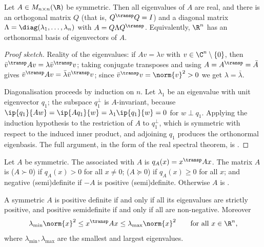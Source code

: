 \begin{theorem}\label{thm:spectral}
	Let $A\in M_{n\times n}(\R)$ be symmetric. Then all eigenvalues of $A$ are real,
	and there is an orthogonal matrix $Q$ (that is, $Q^{\transp}Q=I$) and a diagonal
	matrix $\Lambda=\diag(\lambda_1,\dots,\lambda_n)$ with
	$A=Q\Lambda Q^{\transp}$. Equivalently, $\R^n$ has an orthonormal basis of
	eigenvectors of $A$.
\end{theorem}

\begin{proof}[Proof sketch]
	Reality of the eigenvalues: if $Av=\lambda v$ with $v\in\C^n\setminus\{0\}$,
	then $\bar v^{\transp}Av=\lambda\bar v^{\transp}v$; taking conjugate transposes
	and using $A=A^{\transp}=\bar A$ gives
	$\bar v^{\transp}Av=\bar\lambda\bar v^{\transp}v$; since
	$\bar v^{\transp}v=\norm{v}^2>0$ we get $\lambda=\bar\lambda$.

	Diagonalisation proceeds by induction on $n$. Let $\lambda_1$ be an eigenvalue
	with unit eigenvector $q_1$; the subspace $q_1^{\perp}$ is $A$-invariant,
	because $\ip{q_1}{Aw}=\ip{Aq_1}{w}=\lambda_1\ip{q_1}{w}=0$ for
	$w\perp q_1$. Applying the induction hypothesis to the restriction of $A$ to
	$q_1^\perp$, which is symmetric with respect to the induced inner product, and
	adjoining $q_1$ produces the orthonormal eigenbasis. The full argument, in the
	form of the real spectral theorem, is \textcite[Ch.~7]{axler2024linear}.
\end{proof}

\begin{definition}\label{def:definiteness}
	Let $A$ be symmetric. The  associated with $A$ is
	$q_A(x)=x^{\transp}Ax$. The matrix $A$ is
	 ($A\succ0$) if $q_A(x)>0$
	for all $x\neq0$; 
	($A\succeq0$) if $q_A(x)\geq0$ for all $x$; and negative (semi)definite if $-A$
	is positive (semi)definite. Otherwise $A$ is .
\end{definition}

\begin{proposition}\label{prop:definiteness-eigen}
	A symmetric $A$ is positive definite if and only if all its eigenvalues are
	strictly positive, and positive semidefinite if and only if all are
	non-negative. Moreover
	\[
		\lambda_{\min}\norm{x}^2\leq x^{\transp}Ax\leq\lambda_{\max}\norm{x}^2
		\qquad\text{for all }x\in\R^n,
	\]
	where $\lambda_{\min},\lambda_{\max}$ are the smallest and largest eigenvalues.
\end{proposition}

